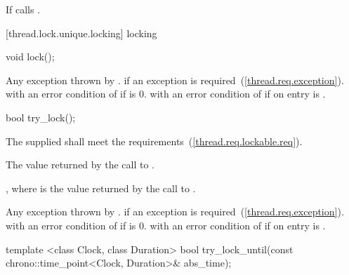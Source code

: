 \begin{itemdescr}
\pnum\effects If  calls .
\end{itemdescr}

[thread.lock.unique.locking]{ locking}

%
%
\begin{itemdecl}
void lock();
\end{itemdecl}

\begin{itemdescr}
\pnum
\effects {}

\pnum
\postcondition {}

\pnum
\throws
Any exception thrown by .  if an exception
is required~(\ref{thread.req.exception}).  with an error
condition of  if  is 0. 
with an error condition of  if on entry 
is .
\end{itemdescr}

%
%
\begin{itemdecl}
bool try_lock();
\end{itemdecl}

\begin{itemdescr}
\pnum
\precondition The supplied  shall meet the 
requirements~(\ref{thread.req.lockable.req}).

\pnum
\effects {}

\pnum\returns The value returned by the call to .

\pnum
\postcondition {}, where  is the value returned by
the call to .

\pnum\throws
Any exception thrown by .  if an exception
is required~(\ref{thread.req.exception}).  with an error
condition of  if  is 0. 
with an error condition of  if on entry 
is .
\end{itemdescr}

%
%
\begin{itemdecl}
template <class Clock, class Duration>
  bool try_lock_until(const chrono::time_point<Clock, Duration>& abs_time);
\end{itemdecl}

